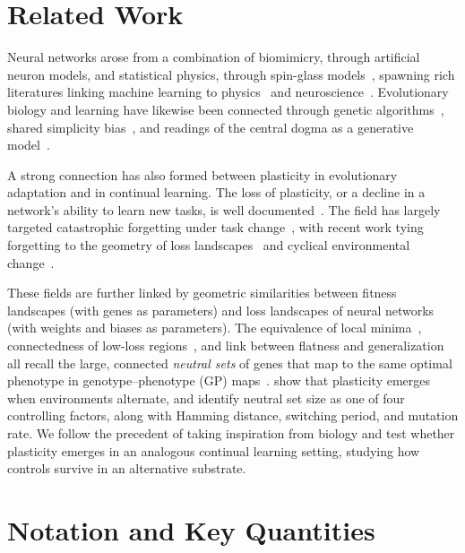 \documentclass[pmlr]{jmlr} %
\begin{document}
\section{Related Work}
\label{sec:related}

Neural networks arose from a combination of biomimicry, through artificial neuron models, and statistical physics, through spin-glass models~\citep{hopfield82}, spawning rich literatures linking machine learning to physics~\citep{statmech20} and neuroscience~\citep{neuro17}. Evolutionary biology and learning have likewise been connected through genetic algorithms~\citep{gareview21}, shared simplicity bias~\citep{Symmetry}, and readings of the central dogma as a generative model~\citep{geneticcode25}.

A strong connection has also formed between plasticity in evolutionary adaptation and in continual learning. The loss of plasticity, or a decline in a network's ability to learn new tasks, is well documented~\citep{plasticlost24, understandplastic23}. The field has largely targeted catastrophic forgetting under task change~\citep{forgetting17, surgury20, plasticlost24}, with recent work tying forgetting to the geometry of loss landscapes~\citep{connectforget21} and cyclical environmental change~\citep{abbas2023}.

These fields are further linked by geometric similarities between fitness landscapes (with genes as parameters) and loss landscapes of neural networks (with weights and biases as parameters). The equivalence of local minima~\citep{surflocalglobal14, localglobalmins17}, connectedness of low-loss regions~\citep{modeConnect2018, convexModeConn22, mechanisticModeConn23, lmc23}, and link between flatness and generalization~\citep{Hochreiter1997Flat, pmlr-v272-haddouche25a, pouplin2023curvaturelosslandscape} all recall the large, connected \emph{neutral sets} of genes that map to the same optimal phenotype in genotype--phenotype (GP) maps~\citep{ReviewGPmaps}. \citet{PlasticGP} show that plasticity emerges when environments alternate, and identify neutral set size as one of four controlling factors, along with Hamming distance, switching period, and mutation rate. We follow the precedent of taking inspiration from biology and test whether plasticity emerges in an analogous continual learning setting, studying how controls survive in an alternative substrate.

\section{Notation and Key Quantities}
\label{sec:notation}
\end{document}
